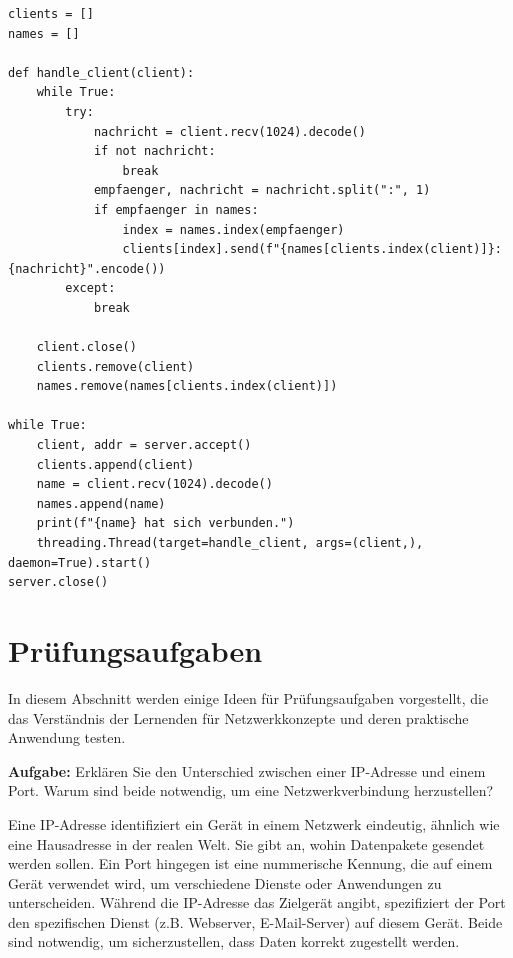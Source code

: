 \begin{myexercise}
\begin{myanswer}
\begin{lstlisting}[caption=\texttt{server.py}]
clients = []
names = []

def handle_client(client):
    while True:
        try:
            nachricht = client.recv(1024).decode()
            if not nachricht:
                break
            empfaenger, nachricht = nachricht.split(":", 1)
            if empfaenger in names:
                index = names.index(empfaenger)
                clients[index].send(f"{names[clients.index(client)]}: {nachricht}".encode())
        except:
            break

    client.close()
    clients.remove(client)
    names.remove(names[clients.index(client)])

while True:
    client, addr = server.accept()
    clients.append(client)
    name = client.recv(1024).decode()
    names.append(name)
    print(f"{name} hat sich verbunden.")
    threading.Thread(target=handle_client, args=(client,), daemon=True).start()
server.close()
            \end{lstlisting}
    \end{myanswer}
\end{myexercise}

\chapter{Prüfungsaufgaben}

In diesem Abschnitt werden einige Ideen für Prüfungsaufgaben vorgestellt, die das Verständnis der Lernenden für Netzwerkkonzepte und deren praktische Anwendung testen.

\begin{myexercise}

    \textbf{Aufgabe:} Erklären Sie den Unterschied zwischen einer IP-Adresse und einem Port. Warum sind beide notwendig, um eine Netzwerkverbindung herzustellen?

    \begin{myanswer}
        Eine IP-Adresse identifiziert ein Gerät in einem Netzwerk eindeutig, ähnlich wie eine Hausadresse in der realen Welt. Sie gibt an, wohin Datenpakete gesendet werden sollen. Ein Port hingegen ist eine nummerische Kennung, die auf einem Gerät verwendet wird, um verschiedene Dienste oder Anwendungen zu unterscheiden. Während die IP-Adresse das Zielgerät angibt, spezifiziert der Port den spezifischen Dienst (z.B. Webserver, E-Mail-Server) auf diesem Gerät. Beide sind notwendig, um sicherzustellen, dass Daten korrekt zugestellt werden.
    \end{myanswer}
\end{myexercise}

